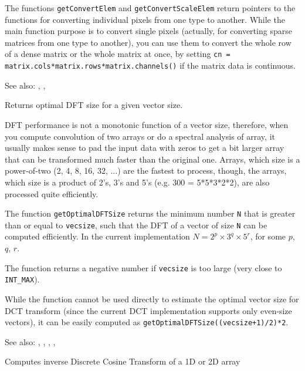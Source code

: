 The functions \texttt{getConvertElem} and \texttt{getConvertScaleElem} return pointers to the functions for converting individual pixels from one type to another. While the main function purpose is to convert single pixels (actually, for converting sparse matrices from one type to another), you can use them to convert the whole row of a dense matrix or the whole matrix at once, by setting \texttt{cn = matrix.cols*matrix.rows*matrix.channels()} if the matrix data is continuous.

See also: , , 


Returns optimal DFT size for a given vector size.

\begin{description}
\end{description}

DFT performance is not a monotonic function of a vector size, therefore, when you compute convolution of two arrays or do a spectral analysis of array, it usually makes sense to pad the input data with zeros to get a bit larger array that can be transformed much faster than the original one.
Arrays, which size is a power-of-two (2, 4, 8, 16, 32, ...) are the fastest to process, though, the arrays, which size is a product of 2's, 3's and 5's (e.g. 300 = 5*5*3*2*2), are also processed quite efficiently.

The function \texttt{getOptimalDFTSize} returns the minimum number \texttt{N} that is greater than or equal to \texttt{vecsize}, such that the DFT
of a vector of size \texttt{N} can be computed efficiently. In the current implementation $N=2^p \times 3^q \times 5^r$, for some $p$, $q$, $r$.

The function returns a negative number if \texttt{vecsize} is too large (very close to \texttt{INT\_MAX}).

While the function cannot be used directly to estimate the optimal vector size for DCT transform (since the current DCT implementation supports only even-size vectors), it can be easily computed as \texttt{getOptimalDFTSize((vecsize+1)/2)*2}.

See also: , , , , 

Computes inverse Discrete Cosine Transform of a 1D or 2D array

